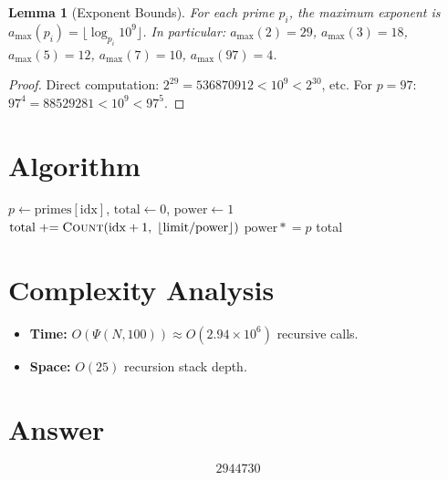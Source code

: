 \documentclass[12pt]{article}
\newtheorem{lemma}[theorem]{Lemma}
\begin{document}
\begin{lemma}[Exponent Bounds]
For each prime $p_i$, the maximum exponent is $a_{\max}(p_i) = \lfloor \log_{p_i} 10^9\rfloor$.
In particular: $a_{\max}(2) = 29$, $a_{\max}(3) = 18$, $a_{\max}(5) = 12$,
$a_{\max}(7) = 10$, $a_{\max}(97) = 4$.
\end{lemma}

\begin{proof}
Direct computation: $2^{29} = 536870912 < 10^9 < 2^{30}$, etc. For $p = 97$:
$97^4 = 88529281 < 10^9 < 97^5$.
\end{proof}

\section{Algorithm}

\begin{algorithmic}[1]
     
    \EndIf
    \State $p \gets \mathrm{primes}[\mathrm{idx}]$, \quad $\mathrm{total} \gets 0$, \quad $\mathrm{power} \gets 1$
        \State $\mathrm{total} \mathrel{+}= \Call{Count}{\mathrm{idx}+1,\; \lfloor\mathrm{limit}/\mathrm{power}\rfloor}$
        \State $\mathrm{power} \mathrel{*}= p$
    \EndWhile
    \State \Return total
\EndFunction
\State \Return {}
\end{algorithmic}

\section{Complexity Analysis}
\begin{itemize}
    \item \textbf{Time:} $O(\Psi(N, 100)) \approx O(2.94 \times 10^6)$ recursive calls.
    \item \textbf{Space:} $O(25)$ recursion stack depth.
\end{itemize}

\section{Answer}

\[
\boxed{2944730}
\]
\end{document}

